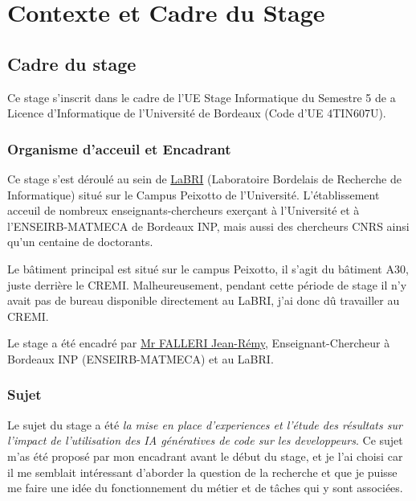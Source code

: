 \chapter{Contexte et Cadre du Stage}
\label{context}

\section{Cadre du stage}

Ce stage s'inscrit dans le cadre de l'UE Stage Informatique du Semestre 5 de a Licence d'Informatique de l'Université de Bordeaux (Code d'UE 4TIN607U).

\subsection{Organisme d'acceuil et Encadrant}

Ce stage s'est déroulé au sein de \href{https://www.labri.fr/}{LaBRI} (Laboratoire Bordelais de Recherche de Informatique) situé sur le Campus Peixotto de l'Université.
L'établissement acceuil de nombreux enseignants-chercheurs exerçant à l'Université et à l'ENSEIRB-MATMECA de Bordeaux INP,
mais aussi des chercheurs CNRS ainsi qu'un centaine de doctorants.

Le bâtiment principal est situé sur le campus Peixotto, il s'agit du bâtiment A30, juste derrière le CREMI.
Malheureusement, pendant cette période de stage il n'y avait pas de bureau disponible directement au LaBRI,
j'ai donc dû travailler au CREMI.

Le stage a été encadré par \href{https://www.labri.fr/perso/falleri/}{Mr FALLERI Jean-Rémy}, Enseignant-Chercheur à Bordeaux INP (ENSEIRB-MATMECA) et au LaBRI.

\subsection{Sujet}

Le sujet du stage a été \emph{la mise en place d'experiences et l'étude des résultats sur l’impact de l’utilisation des IA génératives de code sur les developpeurs}.
Ce sujet m'as été proposé par mon encadrant avant le début du stage, et je l'ai choisi car il me semblait intéressant d'aborder la question de la recherche et que je puisse me faire une idée du fonctionnement du métier et de tâches qui y sont associées.
